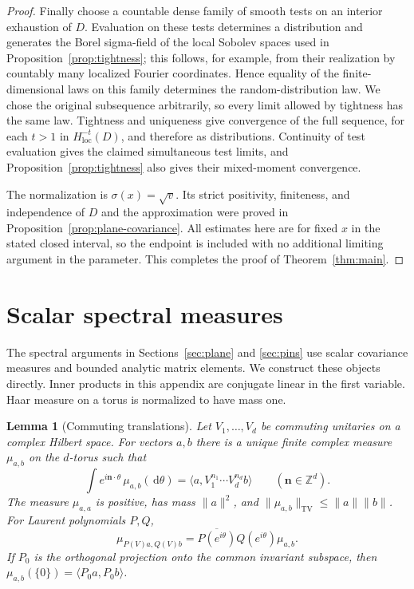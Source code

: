 \documentclass[11pt]{article}
\newcommand{\Z}{\mathbb Z}
\newcommand{\dd}{\,\mathrm d}
\newcommand{\TV}{\mathrm{TV}}
\newtheorem{lemma}[theorem]{Lemma}
\theoremstyle{definition}
\theoremstyle{remark}
\numberwithin{equation}{section}
\begin{document}
\begin{proof}
Finally choose a countable dense family of smooth tests on an
interior exhaustion of \(D\).  Evaluation on these tests determines
a distribution and generates the Borel sigma-field of the local
Sobolev spaces used in Proposition~\ref{prop:tightness}; this follows,
for example, from their realization by countably many localized
Fourier coordinates.  Hence equality of the finite-dimensional
laws on this family determines the random-distribution law.
We chose the original subsequence arbitrarily, so every limit
allowed by tightness has the same law.  Tightness and uniqueness
give convergence of the full sequence, for each \(t>1\) in
\(H^{-t}_{\mathrm{loc}}(D)\), and therefore as distributions.
Continuity of test evaluation gives the claimed simultaneous
test limits, and Proposition~\ref{prop:tightness} also gives their
mixed-moment convergence.

The normalization is \(\sigma(x)=\sqrt v\).
Its strict positivity, finiteness, and independence of \(D\) and
the approximation were proved in
Proposition~\ref{prop:plane-covariance}.  All estimates here are
for fixed \(x\) in the stated closed interval, so the endpoint is
included with no additional limiting argument in the parameter.
This completes the proof of Theorem~\ref{thm:main}.
\end{proof}


\appendix
\section{Scalar spectral measures}\label{sec:scalar-spectra}

The spectral arguments in Sections~\ref{sec:plane} and \ref{sec:pins}
use scalar covariance measures and bounded analytic matrix elements.
We construct these objects directly.  Inner products in this appendix
are conjugate linear in the first variable.  Haar measure on a torus
is normalized to have mass one.

\begin{lemma}[Commuting translations]\label{spectra:unitary}
Let $V_1,\ldots,V_d$ be commuting unitaries on a complex Hilbert space.
For vectors $a,b$ there is a unique finite complex measure $\mu_{a,b}$
on the $d$-torus such that
\[
 \int e^{i\mathbf n\cdot\theta}\,\mu_{a,b}(\dd\theta)
   =\langle a,V_1^{n_1}\cdots V_d^{n_d}b\rangle
 \qquad(\mathbf n\in\Z^d).
\]
The measure $\mu_{a,a}$ is positive, has mass $\|a\|^2$, and
$\|\mu_{a,b}\|_{\TV}\le\|a\|\|b\|$.  For Laurent polynomials $P,Q$,
\[
 \mu_{P(V)a,Q(V)b}
   =\overline{P(e^{i\theta})}Q(e^{i\theta})\mu_{a,b}.
\]
If $P_0$ is the orthogonal projection onto the common invariant
subspace, then $\mu_{a,b}(\{0\})=\langle P_0a,P_0b\rangle$.
\end{lemma}
\end{document}
